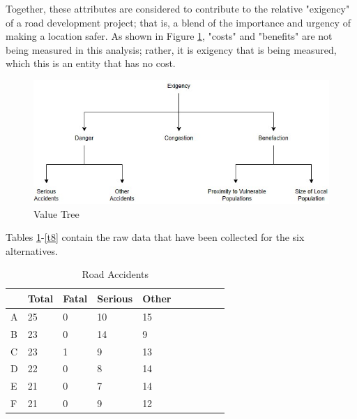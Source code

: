 \documentclass[11pt, a4paper]{article}
\begin{document}
    Together, these attributes are considered to contribute to the relative "exigency" of a road development project; that is, a blend of the importance and urgency of making a location safer. As shown in Figure \ref{f3}, "costs" and "benefits" are not being measured in this analysis; rather, it is exigency that is being measured, which this is an entity that has no cost.

    \begin{figure}[hbt!]
        \centering
        \includegraphics[width=\textwidth]{figures/3.jpg}
        \caption{Value Tree}
        \label{f3}
    \end{figure}

    Tables \ref{t5}-\ref{t8} contain the raw data that have been collected for the six alternatives.

    \begin{table}[!ht]
        \centering
        \begin{tabular}{|l|l|l|l|l|l|l|l|l|l|}
        \hline
            ~ & Total & Fatal & Serious & Other       \\ \hline
            A & 25 & 0 & 10 & 15       \\ \hline
            B & 23 & 0 & 14 & 9       \\ \hline
            C & 23 & 1 & 9 & 13       \\ \hline
            D & 22 & 0 & 8 & 14       \\ \hline
            E & 21 & 0 & 7 & 14       \\ \hline
            F & 21 & 0 & 9 & 12       \\ \hline
        \end{tabular}
        \caption{Road Accidents}
        \label{t5}
    \end{table}
\end{document}
